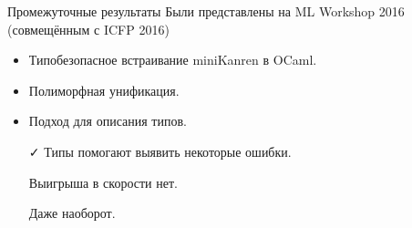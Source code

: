 \documentclass[10pt, mathserif]{beamer}
\theoremstyle{definition}
\begin{document}
\begin{frame}[fragile]{Промежуточные результаты}
Были представлены на ML Workshop 2016 (совмещённым с ICFP 2016)
\begin{itemize}
\item Типобезопасное встраивание miniKanren в OCaml.
\item Полиморфная унификация.
\item Подход для описания типов.
\end{itemize}

\vspace{2em}
\pause
\begin{enumerate}
 \item[\faCheck] Типы помогают выявить некоторые ошибки.
 \pause
 \item[\faTimes] Выигрыша в скорости нет.
 \item[\faTimes] Даже наоборот.
\end{enumerate}

\end{frame}

%
%
%
%
%
\end{document}
